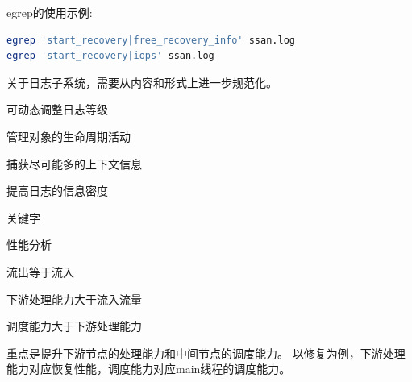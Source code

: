 egrep的使用示例:
\begin{lstlisting}[language=bash,frame=single]
egrep 'start_recovery|free_recovery_info' ssan.log
egrep 'start_recovery|iops' ssan.log
\end{lstlisting}

关于日志子系统，需要从内容和形式上进一步规范化。
\begin{enumbox}
\item 可动态调整日志等级
\item 管理对象的生命周期活动
\item 捕获尽可能多的上下文信息
\item 提高日志的信息密度
\item 关键字
\end{enumbox}

性能分析
\begin{enumbox}
\item 流出等于流入
\item 下游处理能力大于流入流量
\item 调度能力大于下游处理能力
\end{enumbox}

重点是提升下游节点的处理能力和中间节点的调度能力。
以修复为例，下游处理能力对应恢复性能，调度能力对应main线程的调度能力。
